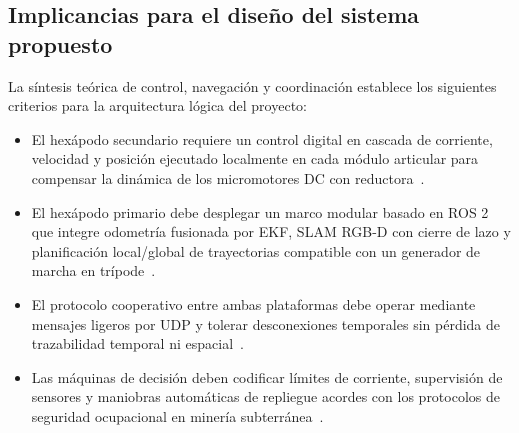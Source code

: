 \subsection{Implicancias para el diseño del sistema propuesto}

La síntesis teórica de control, navegación y coordinación establece los siguientes criterios para la arquitectura lógica del proyecto:

\begin{itemize}
    \item El hexápodo secundario requiere un control digital en cascada de corriente, velocidad y posición ejecutado localmente en cada módulo articular para compensar la dinámica de los micromotores DC con reductora~\cite{threeLoopControl1, Budai_CascadeControl_2020}.
    \item El hexápodo primario debe desplegar un marco modular basado en ROS 2 que integre odometría fusionada por EKF, SLAM RGB-D con cierre de lazo y planificación local/global de trayectorias compatible con un generador de marcha en trípode~\cite{cadena2016past, KimChoi_2025_MineMapping}.
    \item El protocolo cooperativo entre ambas plataformas debe operar mediante mensajes ligeros por UDP y tolerar desconexiones temporales sin pérdida de trazabilidad temporal ni espacial~\cite{OSINERGMIN_BoletinGSM_2020, EU_ExposureDirective_2020}.
    \item Las máquinas de decisión deben codificar límites de corriente, supervisión de sensores y maniobras automáticas de repliegue acordes con los protocolos de seguridad ocupacional en minería subterránea~\cite{MINEM_DS024_2016, MINEM_Yanaquihua_2023}.
\end{itemize}
